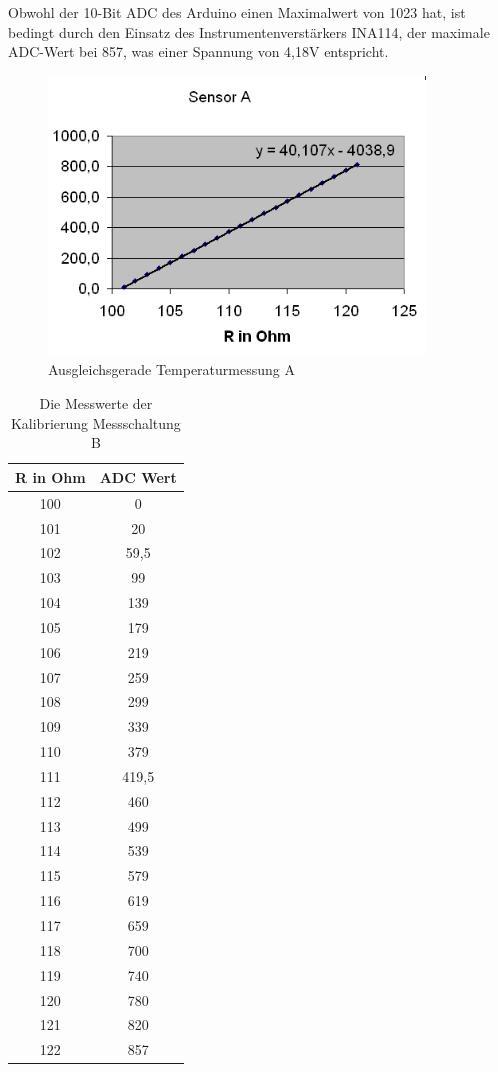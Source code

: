 \documentclass[a4paper,bibtotoc,oneside]{scrbook}
\begin{document}
Obwohl der 10-Bit ADC des Arduino einen Maximalwert von 1023 hat, ist bedingt durch den Einsatz des Instrumentenverstärkers INA114, der maximale ADC-Wert bei 857, was einer Spannung von 4,18V entspricht.  


\begin{figure}[htbp]
\centering
\includegraphics[width=100mm]{img/messa.png}
\caption{Ausgleichsgerade Temperaturmessung A}\label{messa}
\end{figure}

\begin{table}[htbp]
\centering
\begin{tabular}{ | c | c | }\hline
{\bf R in Ohm} & {\bf ADC Wert}\\ \hline
\hline
100 & 0\\ \hline
101 & 20\\ \hline
102 & 59,5\\ \hline
103 & 99\\ \hline
104 & 139\\ \hline
105 & 179\\ \hline
106 & 219\\ \hline
107 & 259\\ \hline
108 & 299\\ \hline
109 & 339\\ \hline
110 & 379\\ \hline
111 & 419,5\\ \hline
112 & 460\\ \hline
113 & 499\\ \hline
114 & 539\\ \hline
115 & 579\\ \hline
116 & 619\\ \hline
117 & 659\\ \hline
118 & 700\\ \hline
119 & 740\\ \hline
120 & 780\\ \hline
121 & 820\\ \hline
122 & 857\\ \hline
\end{tabular}
\caption{Die Messwerte der Kalibrierung Messschaltung B}\label{TabB}
\end{table}
\end{document}
